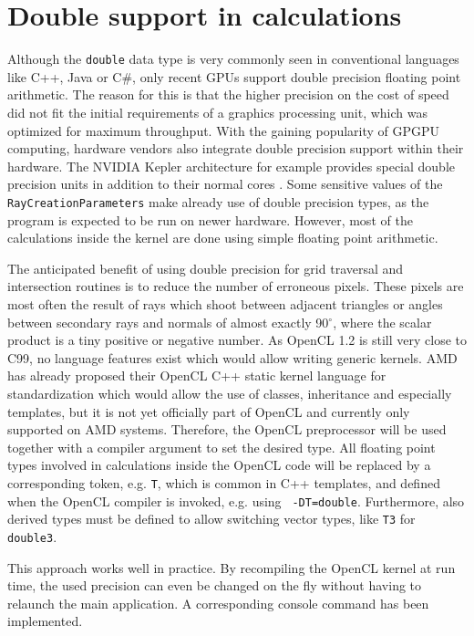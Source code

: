 \section{Double support in calculations}

Although the \lstinline!double! data type is very commonly seen in conventional languages like C++, Java or C\#, only recent GPUs support double precision floating point arithmetic. The reason for this is that the higher precision on the cost of speed did not fit the initial requirements of a graphics processing unit, which was optimized for maximum throughput. With the gaining popularity of GPGPU computing, hardware vendors also integrate double precision support within their hardware. The NVIDIA Kepler architecture for example provides special double precision units in addition to their normal cores \cite[p.8]{kepler_arch}. Some sensitive values of the \lstinline!RayCreationParameters! make already use of double precision types, as the program is expected to be run on newer hardware. However, most of the calculations inside the kernel are done using simple floating point arithmetic.

The anticipated benefit of using double precision for grid traversal and intersection routines is to reduce the number of erroneous pixels. These pixels are most often the result of rays which shoot between adjacent triangles or angles between secondary rays and normals of almost exactly 90$^\circ$, where the scalar product is a tiny positive or negative number. As OpenCL 1.2 is still very close to C99, no language features exist which would allow writing generic kernels. AMD has already proposed their OpenCL C++ static kernel language for standardization which would allow the use of classes, inheritance and especially templates, but it is not yet officially part of OpenCL and currently only supported on AMD systems. Therefore, the OpenCL preprocessor will be used together with a compiler argument to set the desired type. All floating point types involved in calculations inside the OpenCL code will be replaced by a corresponding token, e.g. \lstinline!T!, which is common in C++ templates, and defined when the OpenCL compiler is invoked, e.g. using \lstinline! -DT=double!. Furthermore, also derived types must be defined to allow switching vector types, like \lstinline!T3! for \lstinline!double3!.

\pagebreak

This approach works well in practice. By recompiling the OpenCL kernel at run time, the used precision can even be changed on the fly without having to relaunch the main application. A corresponding console command has been implemented.

